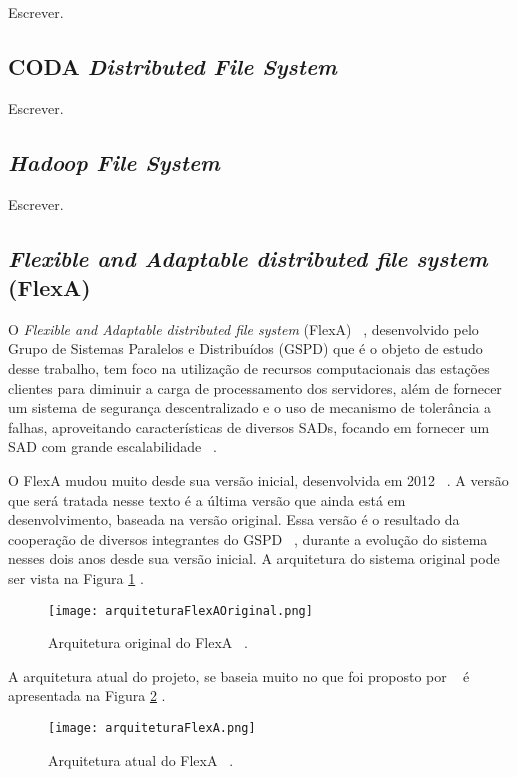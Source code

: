     Escrever.
    
    \subsection{CODA \textit{Distributed File System}}
    
    Escrever.
    
    \subsection{\textit{Hadoop File System}}
    
    Escrever.
    
    \subsection{\textit{Flexible and Adaptable distributed file system} (FlexA)}
	 
	 O \textit{Flexible and Adaptable distributed file system} (FlexA) ~\cite{silas}, desenvolvido pelo Grupo de Sistemas Paralelos e Distribuídos (GSPD) que é o objeto de estudo desse trabalho, tem foco na utilização de recursos computacionais das estações clientes para diminuir a carga de processamento dos servidores, além de fornecer um sistema de segurança descentralizado e o uso de mecanismo de tolerância a falhas, aproveitando características de diversos SADs, focando em fornecer um SAD com grande escalabilidade ~\cite{silas}.
	
	 O FlexA mudou muito desde sua versão inicial, desenvolvida em 2012 ~\cite{mario}. A versão que será tratada nesse texto é a última versão que ainda está em desenvolvimento, baseada na versão original. Essa versão é o resultado da cooperação de diversos integrantes do GSPD ~\cite{mario}, durante a evolução do sistema nesses dois anos desde sua versão inicial. A arquitetura do sistema original pode ser vista na Figura \ref{fig:arquiteturaFlexaOriginal} .
	 
	 \begin{figure}
	 \centering
	 \texttt{[image: arquiteturaFlexAOriginal.png]}
	 \caption{Arquitetura original do FlexA ~\cite{silas}.}
	 \label{fig:arquiteturaFlexaOriginal}
	 \end{figure}
	 
	 A arquitetura atual do projeto, se baseia muito no que foi proposto por ~\cite{silas} é apresentada na Figura \ref{fig:arquiteturaFlexa} .
	 
	 \begin{figure}
	 \centering
	 \texttt{[image: arquiteturaFlexA.png]}
	 \caption{Arquitetura atual do FlexA ~\cite{mario}.}
	 \label{fig:arquiteturaFlexa}
	 \end{figure}
	 
